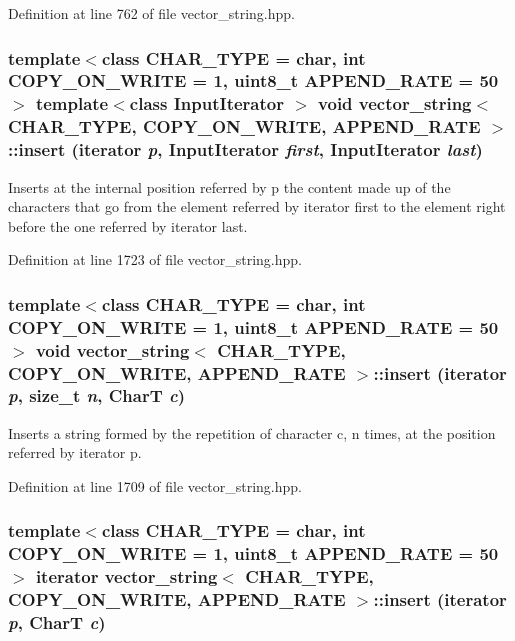 Definition at line 762 of file vector\_\-string.hpp.\hypertarget{classvector__string_6eb256890eb9c74e68961a837d228011}{
\subsubsection[{insert}]{\setlength{\rightskip}{0pt plus 5cm}template$<$class CHAR\_\-TYPE  = char, int COPY\_\-ON\_\-WRITE = 1, uint8\_\-t APPEND\_\-RATE = 50$>$ template$<$class InputIterator $>$ void {\bf vector\_\-string}$<$ CHAR\_\-TYPE, COPY\_\-ON\_\-WRITE, APPEND\_\-RATE $>$::insert (iterator {\em p}, \/  InputIterator {\em first}, \/  InputIterator {\em last})}}
\label{classvector__string_6eb256890eb9c74e68961a837d228011}


Inserts at the internal position referred by p the content made up of the characters that go from the element referred by iterator first to the element right before the one referred by iterator last. 

Definition at line 1723 of file vector\_\-string.hpp.\hypertarget{classvector__string_0f84ccc1d6e7829d6514c9afeb6ec454}{
\subsubsection[{insert}]{\setlength{\rightskip}{0pt plus 5cm}template$<$class CHAR\_\-TYPE  = char, int COPY\_\-ON\_\-WRITE = 1, uint8\_\-t APPEND\_\-RATE = 50$>$ void {\bf vector\_\-string}$<$ CHAR\_\-TYPE, COPY\_\-ON\_\-WRITE, APPEND\_\-RATE $>$::insert (iterator {\em p}, \/  size\_\-t {\em n}, \/  CharT {\em c})}}
\label{classvector__string_0f84ccc1d6e7829d6514c9afeb6ec454}


Inserts a string formed by the repetition of character c, n times, at the position referred by iterator p. 

Definition at line 1709 of file vector\_\-string.hpp.\hypertarget{classvector__string_6251982b3c851185d13665546d77f7ac}{
\subsubsection[{insert}]{\setlength{\rightskip}{0pt plus 5cm}template$<$class CHAR\_\-TYPE  = char, int COPY\_\-ON\_\-WRITE = 1, uint8\_\-t APPEND\_\-RATE = 50$>$ iterator {\bf vector\_\-string}$<$ CHAR\_\-TYPE, COPY\_\-ON\_\-WRITE, APPEND\_\-RATE $>$::insert (iterator {\em p}, \/  CharT {\em c})}}
\label{classvector__string_6251982b3c851185d13665546d77f7ac}


